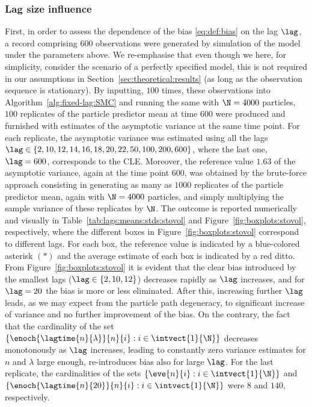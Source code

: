 \subsubsection{Lag size influence}
\label{sec:lag:size:influence}

First, in order to assess the dependence of the bias \eqref{eq:def:bias} on the lag $\lag$, a record comprising $600$ observations were generated by simulation of the model under the parameters above. We re-emphasise that even though we here, for simplicity, consider the scenario of a perfectly specified model, this is not required in our assumptions in Section~\ref{sec:theoretical:results} (as long as the observation sequence is stationary). By inputting, $100$ times, these observations into Algorithm~\ref{alg:fixed-lag:SMC} and running the same with $\N = 4000$ particles, $100$ replicates of the particle predictor mean at time $600$ were produced and furnished with estimates of the asymptotic variance at the same time point. For each replicate, the asymptotic variance was estimated using all the lags $\lag \in \{2, 10, 12, 14, 16, 18, 20, 22, 50, 100, 200, 600\}$, where the last one, $\lag = 600$, corresponds to the CLE. Moreover, the reference value $1.63$ of the asymptotic variance, again at the time point $600$, was obtained by the brute-force approach consisting in generating as many as $1000$ replicates of the particle predictor mean, again with $\N = 4000$ particles, and simply multiplying the sample variance of these replicates by $\N$. The outcome is reported numerically and visually in Table~\ref{tab:lags:means:stds:stovol} and Figure~\ref{fig:boxplots:stovol}, respectively, where the different boxes in Figure~\ref{fig:boxplots:stovol} correspond to different lags. For each box, the reference value is indicated by a blue-colored asterisk $(\ast)$ and the average estimate of each box is indicated by a red ditto. From Figure~\ref{fig:boxplots:stovol} it is evident that the clear bias introduced by the smallest lags ($\lag \in \{2, 10, 12\}$) decreases rapidly as $\lag$ increases, and for $\lag = 20$ the bias is more or less eliminated. After this, increasing further $\lag$ leads, as we may expect from the particle path degeneracy, to significant increase of variance and no further improvement of the bias. On the contrary, the fact that the cardinality of the set $\{\enoch{\lagtime{n}{\lambda}}{n}{i} : i \in \intvect{1}{\N} \}$ decreases monotonously as $\lag$ increases, leading to constantly zero variance estimates for $n$ and $\lambda$ large enough, re-introduces bias also for large $\lag$. For the last replicate, the cardinalities of the sets $\{ \eve{n}{i} : i \in \intvect{1}{\N} \}$ and $\{\enoch{\lagtime{n}{20}}{n}{i} : i \in \intvect{1}{\N} \}$ were $8$ and $140$, respectively.  
